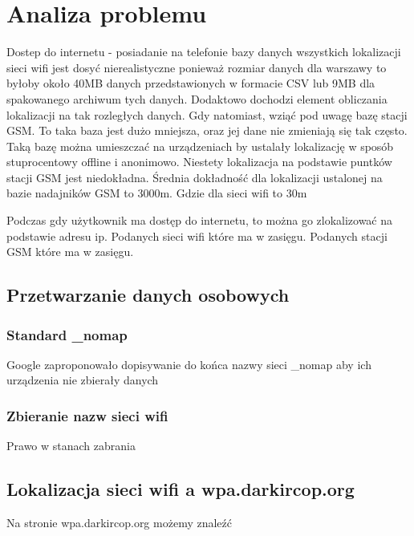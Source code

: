 \chapter{Analiza problemu}
Dostep do internetu - posiadanie na telefonie bazy danych wszystkich lokalizacji sieci wifi jest dosyć nierealistyczne ponieważ rozmiar danych dla warszawy to byłoby około 40MB danych przedstawionych w formacie CSV lub 9MB dla spakowanego archiwum tych danych. Dodaktowo dochodzi element obliczania lokalizacji na tak rozległych danych. Gdy natomiast, wziąć pod uwagę bazę stacji GSM. To taka baza jest dużo mniejsza, oraz jej dane nie zmieniają się tak często. Taką bazę można umieszczać na urządzeniach by ustalały lokalizację w sposób stuprocentowy offline i anonimowo. Niestety lokalizacja na podstawie puntków stacji GSM jest niedokładna. Średnia dokładność dla lokalizacji ustalonej na bazie nadajników GSM to 3000m. Gdzie dla sieci wifi to 30m


Podczas gdy użytkownik ma dostęp do internetu, to można go zlokalizować na podstawie adresu ip. Podanych sieci wifi które ma w zasięgu. Podanych stacji GSM które ma w zasięgu.

\section{Przetwarzanie danych osobowych}

\subsection{Standard \_nomap}
Google zaproponowało dopisywanie do końca nazwy sieci _nomap aby ich urządzenia nie zbierały danych
\subsection{Zbieranie nazw sieci wifi}
Prawo w stanach zabrania

\section{Lokalizacja sieci wifi a wpa.darkircop.org}
Na stronie wpa.darkircop.org możemy znaleźć 
